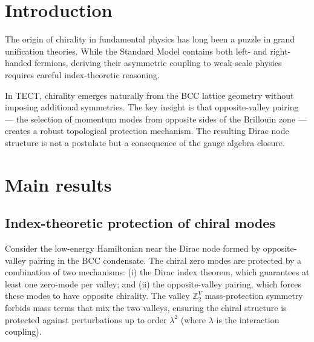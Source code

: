 \maketitle

\section{Introduction}
The origin of chirality in fundamental physics has long been a puzzle in grand unification
theories. While the Standard Model contains both left- and right-handed fermions, deriving
their asymmetric coupling to weak-scale physics requires careful index-theoretic reasoning.

In TECT, chirality emerges naturally from the BCC lattice geometry without imposing
additional symmetries. The key insight is that opposite-valley pairing — the selection of
momentum modes from opposite sides of the Brillouin zone — creates a robust topological
protection mechanism. The resulting Dirac node structure is not a postulate but a
consequence of the gauge algebra closure.

\section{Main results}

\subsection{Index-theoretic protection of chiral modes}
\begin{theorem}
\label{thm:chirality}
Consider the low-energy Hamiltonian near the Dirac node formed by opposite-valley pairing
in the BCC condensate. The chiral zero modes are protected by a combination of two
mechanisms: (i) the Dirac index theorem, which guarantees at least one zero-mode per valley;
and (ii) the opposite-valley pairing, which forces these modes to have opposite chirality.
The valley $\mathbb{Z}_2^V$ mass-protection symmetry forbids mass terms that mix the two valleys,
ensuring the chiral structure is protected against perturbations up to order $\lambda^2$
(where $\lambda$ is the interaction coupling).
\end{theorem}

